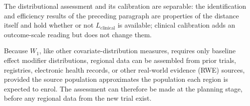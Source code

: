 \documentclass[AMA,Times1COL]{WileyNJDv5}
\begin{document}
The distributional assessment and its calibration are separable: the identification and efficiency results of the preceding paragraph are properties of the distance itself and hold whether or not $L_{\text{clinical}}$ is available; clinical calibration adds an outcome-scale reading but does not change them.


Because $W_1$, like other covariate-distribution measures, requires only baseline effect modifier distributions, regional data can be assembled from prior trials, registries, electronic health records, or other real-world evidence (RWE) sources, provided the source population approximates the population each region is expected to enrol. The assessment can therefore be made at the planning stage, before any regional data from the new trial exist.
\end{document}
